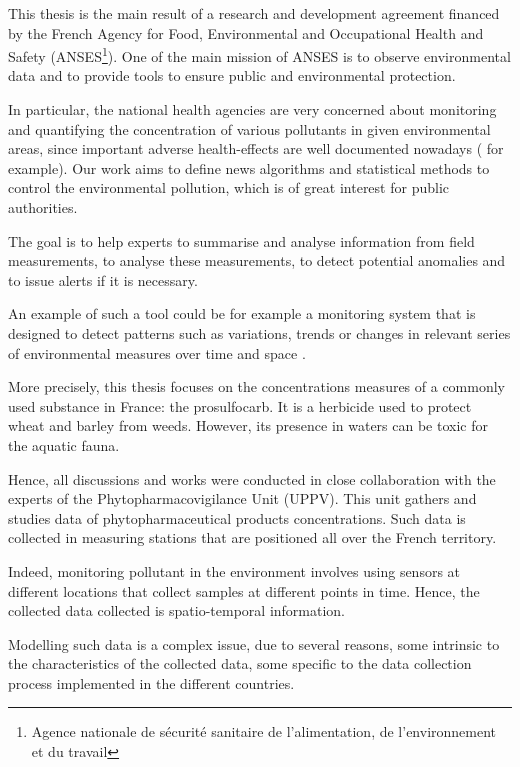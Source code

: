 This thesis is the main result of a research and development agreement financed by the French Agency for Food, Environmental and Occupational Health and Safety (ANSES\footnote{Agence nationale de sécurité sanitaire de l’alimentation, de l’environnement et du travail}). One of the main mission of  ANSES is to observe environmental data and to provide tools to ensure public and environmental protection.

In particular, the national health agencies are very concerned about monitoring and quantifying the concentration of various pollutants in given environmental areas, since important adverse health-effects are well documented nowadays (\cite{khopkar2007,Marchant2018,NOUGADERE201432} for example). Our work aims to define news algorithms and statistical methods to control the environmental pollution, which  is of great interest for public authorities. 

The goal is to help experts to summarise and analyse information from field measurements, to analyse these measurements, to detect potential anomalies and to issue   alerts  if  it  is  necessary.

An example of such a tool could be for example a monitoring system that is designed to detect patterns such as variations, trends or changes in relevant series of environmental measures over time and space \citep{Manly2008}.

More precisely, this thesis focuses on the concentrations measures of a commonly used substance in France: the prosulfocarb. It is a herbicide used to protect wheat and barley from weeds. However, its presence in waters can be toxic for the aquatic fauna.  

Hence, all discussions and works were conducted in close collaboration with the experts of the Phytopharmacovigilance Unit (UPPV). This unit gathers and studies data of phytopharmaceutical products concentrations. Such data is collected in measuring stations that are positioned all over the French territory. 

Indeed, monitoring pollutant in the environment involves using sensors at different locations that collect samples at different points in time. Hence, the collected data collected is spatio-temporal information. 

Modelling such data is a complex issue, due to several reasons, some intrinsic to the characteristics of the collected data, some specific to the data collection process implemented in the different countries.

